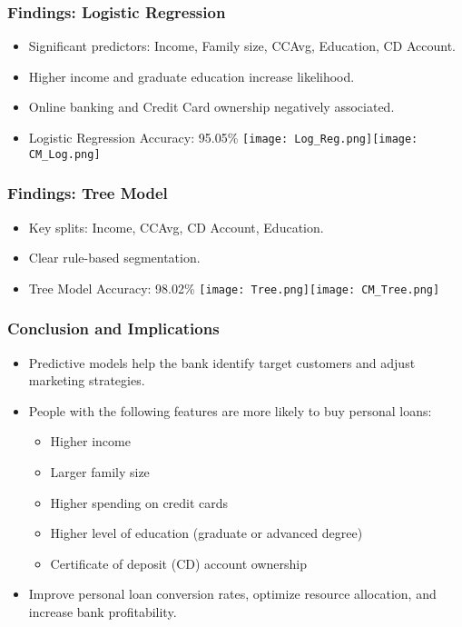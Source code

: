 \documentclass{beamer}
\begin{document}
\begin{frame}
\frametitle{Findings: Logistic Regression}
\begin{itemize}
  \item Significant predictors: Income, Family size, CCAvg, Education, CD Account.
  \item Higher income and graduate education increase likelihood.
  \item Online banking and Credit Card ownership negatively associated.
  \item Logistic Regression Accuracy: 95.05\%
\texttt{[image: Log\_Reg.png]}\texttt{[image: CM\_Log.png]}
\end{itemize}
\end{frame}

\begin{frame}
\frametitle{Findings: Tree Model}
\begin{itemize}
  \item Key splits: Income, CCAvg, CD Account, Education.
  \item Clear rule-based segmentation.
  \item Tree Model Accuracy: 98.02\%
\texttt{[image: Tree.png]}\texttt{[image: CM\_Tree.png]}
\end{itemize}
\end{frame}


\begin{frame}
\frametitle{Conclusion and Implications}
\begin{itemize}
  \item Predictive models help the bank identify target customers and adjust marketing strategies.
  \item People with the following features are more likely to buy personal loans:
  \begin{itemize}
    \item Higher income
    \item Larger family size
    \item Higher spending on credit cards
    \item Higher level of education (graduate or advanced degree)
    \item Certificate of deposit (CD) account ownership
  \end{itemize}
  \item Improve personal loan conversion rates, optimize resource allocation, and increase bank profitability.
\end{itemize}
\end{frame}
\end{document}
